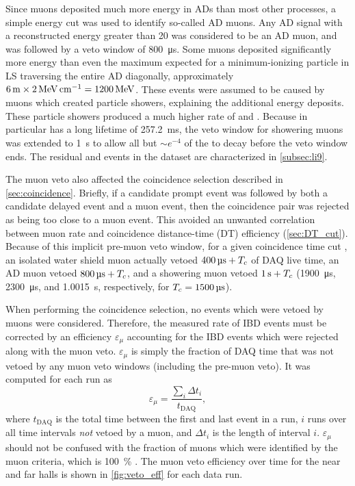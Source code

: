 Since muons deposited much more energy in ADs than most other processes,
a simple energy cut was used to identify so-called AD muons.
Any AD signal with a reconstructed energy greater than \SI{20}{\mev}
was considered to be an AD muon, and was followed by a veto window
of \SI{800}{\micro\second}.
Some muons deposited significantly more energy than
even the maximum expected for a minimum-ionizing particle in LS
traversing the entire AD diagonally, approximately
$\SI{6}{\meter}\times\SI{2}{\mev\per\cm}=\SI{1200}{\mev}$.
These events were assumed to be caused by muons which created particle showers,
explaining the additional energy deposits.
These particle showers produced a much higher rate of
\li{} and \he{}.
Because \li{} in particular has a long lifetime of \SI{257.2}{\milli\second},
the veto window for showering muons was extended to \SI{1}{\second}
to allow all but ${\sim}e^{-4}$ of the \li{} to decay before the veto window ends.
The residual \li{} and \he{} events in the dataset are characterized
in \cref{subsec:li9}.

The muon veto also affected the coincidence selection
described in \cref{sec:coincidence}.
Briefly, if a candidate prompt event was followed
by both a candidate delayed event and a muon event,
then the coincidence pair was rejected as being too close to a muon event.
This avoided an unwanted correlation between muon rate
and coincidence distance-time (DT) efficiency (\cref{sec:DT_cut}).
Because of this implicit pre-muon veto window,
for a given coincidence time cut \tc,
an isolated water shield muon actually vetoed $\SI{400}{\micro\second}+T_c$
of DAQ live time,
an AD muon vetoed $\SI{800}{\micro\second}+T_c$,
and a showering muon vetoed $\SI{1}{\second}+T_c$
(\SI{1900}{\us}, \SI{2300}{\us}, and \SI{1.0015}{\s}, respectively,
for $\tc=\SI{1500}{\us}$).

When performing the coincidence selection, no events which were vetoed by muons
were considered.
Therefore, the measured rate of IBD events
must be corrected by an efficiency $\varepsilon_\mu$
accounting for the IBD events which were rejected along with the muon veto.
$\varepsilon_\mu$ is simply the fraction of DAQ time
that was not vetoed by any muon veto windows (including the pre-muon veto).
It was computed for each run as
\begin{equation}\label{eq:muon_eff}
    \varepsilon_\mu = \frac{\sum_i \Delta t_i}{t_{\text{DAQ}}},
\end{equation}
where $t_{\text{DAQ}}$ is the total time
between the first and last event in a run,
$i$ runs over all time intervals \textit{not} vetoed by a muon,
and $\Delta t_i$ is the length of interval $i$.
$\varepsilon_\mu$ should not be confused
with the fraction of muons which were identified by the muon criteria,
which is \SI{100}{\percent} \cite{muonsystem2015}.
The muon veto efficiency over time for the near and far halls
is shown in \cref{fig:veto_eff} for each data run.

